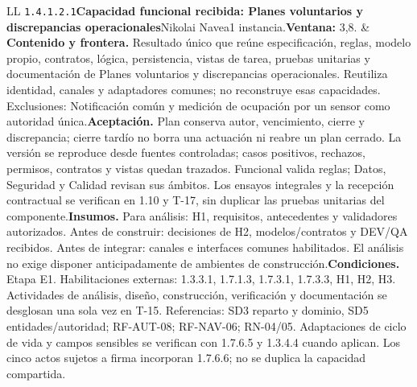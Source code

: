 \begin{longtable}{L{\tabcolsep\relax}L{\tabcolsep\relax}}
\texttt{1.\allowbreak{}4.\allowbreak{}1.\allowbreak{}2.\allowbreak{}1}\newline{}\textbf{Capacidad funcional recibida: Planes voluntarios y discrepancias operacionales}\newline{}Nikolai Navea\newline{}1 instancia.\newline{}\textbf{Ventana:} 3,8. & \textbf{Contenido y frontera.} Resultado único que reúne especificación, reglas, modelo propio, contratos, lógica, persistencia, vistas de tarea, pruebas unitarias y documentación de Planes voluntarios y discrepancias operacionales. Reutiliza identidad, canales y adaptadores comunes; no reconstruye esas capacidades. Exclusiones: Notificación común y medición de ocupación por un sensor como autoridad única.\newline{}\textbf{Aceptación.} Plan conserva autor, vencimiento, cierre y discrepancia; cierre tardío no borra una actuación ni reabre un plan cerrado. La versión se reproduce desde fuentes controladas; casos positivos, rechazos, permisos, contratos y vistas quedan trazados. Funcional valida reglas; Datos, Seguridad y Calidad revisan sus ámbitos. Los ensayos integrales y la recepción contractual se verifican en 1.10 y T-17, sin duplicar las pruebas unitarias del componente.\newline{}\textbf{Insumos.} Para análisis: H1, requisitos, antecedentes y validadores autorizados. Antes de construir: decisiones de H2, modelos/contratos y DEV/QA recibidos. Antes de integrar: canales e interfaces comunes habilitados. El análisis no exige disponer anticipadamente de ambientes de construcción.\newline{}\textbf{Condiciones.} Etapa E1. Habilitaciones externas: 1.3.3.1, 1.7.1.3, 1.7.3.1, 1.7.3.3, H1, H2, H3. Actividades de análisis, diseño, construcción, verificación y documentación se desglosan una sola vez en T-15. Referencias: SD3 reparto y dominio, SD5 entidades/autoridad; RF-AUT-08; RF-NAV-06; RN-04/05. Adaptaciones de ciclo de vida y campos sensibles se verifican con 1.7.6.5 y 1.3.4.4 cuando aplican. Los cinco actos sujetos a firma incorporan 1.7.6.6; no se duplica la capacidad compartida.\\\hline

\end{longtable}
